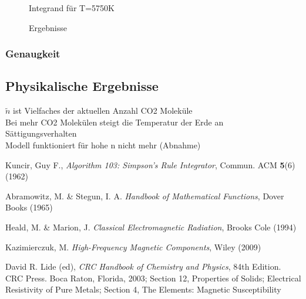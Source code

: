 \documentclass[10pt,a4paper]{article}
\begin{document}
\begin{figure}[htbp]
\centering

\caption{Integrand für T=5750K}


\caption{Ergebnisse}
\end{figure}

\subsubsection{Genaugkeit}

\subsection{Physikalische Ergebnisse}
\label{ssec:physikalischeergebnisse}

$\tilde{n}$ ist Vielfaches der aktuellen Anzahl CO2 Moleküle\\
Bei mehr CO2 Molekülen steigt die Temperatur der Erde an\\
Sättigungsverhalten\\
Modell funktioniert für hohe n nicht mehr (Abnahme)

\begin{thebibliography}{9}

 Kuncir, Guy F.,
 \emph{Algorithm 103: Simpson's Rule Integrator},
 Commun. ACM \textbf{5}(6) (1962)


Abramowitz, M. \& Stegun, I. A.
\emph{Handbook of Mathematical Functions},
Dover Books (1965)

Heald, M. \& Marion, J.
\emph{Classical Electromagnetic Radiation},
Brooks Cole (1994)

Kazimierczuk, M.
\emph{High-Frequency Magnetic Components},
Wiley (2009)

David R. Lide (ed),
\emph{CRC Handbook of Chemistry and Physics},
84th Edition. CRC Press. Boca Raton, Florida, 2003;
Section 12, Properties of Solids; Electrical Resistivity of Pure Metals;
Section 4, The Elements: Magnetic Susceptibility

\end{thebibliography}
\end{document}
